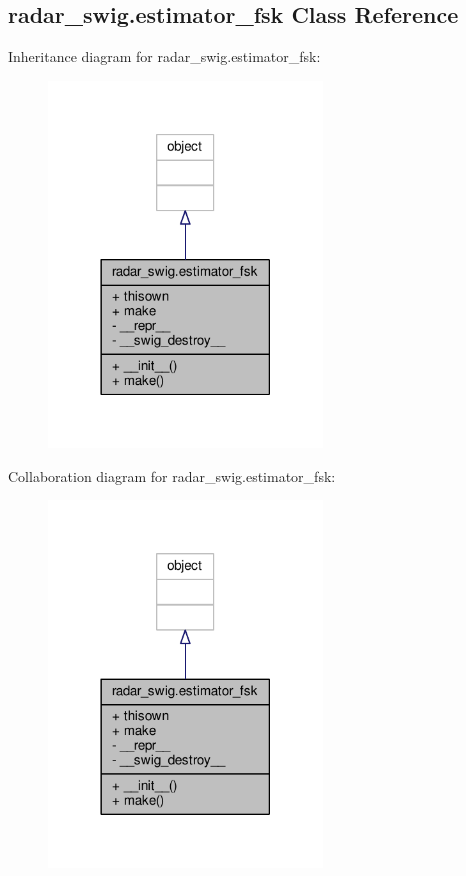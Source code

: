 \subsection{radar\+\_\+swig.\+estimator\+\_\+fsk Class Reference}
\label{classradar__swig_1_1estimator__fsk}


Inheritance diagram for radar\+\_\+swig.\+estimator\+\_\+fsk\+:
\nopagebreak
\begin{figure}[H]
\begin{center}
\leavevmode
\includegraphics[width=206pt]{d8/dc2/classradar__swig_1_1estimator__fsk__inherit__graph}
\end{center}
\end{figure}


Collaboration diagram for radar\+\_\+swig.\+estimator\+\_\+fsk\+:
\nopagebreak
\begin{figure}[H]
\begin{center}
\leavevmode
\includegraphics[width=206pt]{da/d13/classradar__swig_1_1estimator__fsk__coll__graph}
\end{center}
\end{figure}
